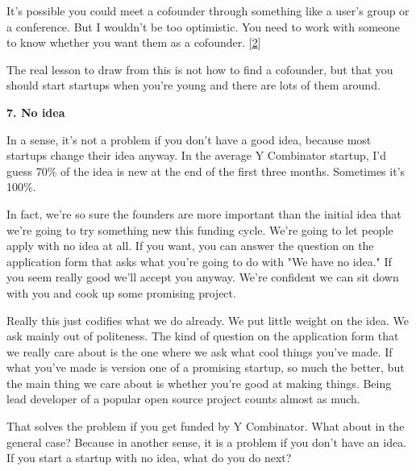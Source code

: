 It's possible you could meet a
                    cofounder through something like a user's group or a
                    conference. But I wouldn't be too optimistic. You need to
                    work with someone to know whether you want them as a
                    cofounder.
                    [\href{\#f2n}{2}]

The real lesson to draw from this is not how to
                    find a cofounder, but that you should start startups when
                    you're young and there are lots of them around.

\textbf{7. No idea}

In a sense, it's not a problem if you don't
                    have a good idea, because most startups change their idea
                    anyway. In the average Y Combinator startup, I'd guess 70\%
                    of the idea is new at the end of the first three months.
                    Sometimes it's 100\%.

In fact, we're so sure the
                    founders are more important than the initial idea that we're
                    going to try something new this funding cycle. We're going
                    to let people apply with no idea at all. If you want, you
                    can answer the question on the application form that asks
                    what you're going to do with "We have no idea." If you seem
                    really good we'll accept you anyway. We're confident we can
                    sit down with you and cook up some promising project.

Really
                    this just codifies what we do already. We put little weight
                    on the idea. We ask mainly out of politeness. The kind of
                    question on the application form that we really care about
                    is the one where we ask what cool things you've made. If
                    what you've made is version one of a promising startup, so
                    much the better, but the main thing we care about is whether
                    you're good at making things. Being lead developer of a
                    popular open source project counts almost as much.

That
                    solves the problem if you get funded by Y Combinator. What
                    about in the general case? Because in another sense, it is a
                    problem if you don't have an idea. If you start a startup
                    with no idea, what do you do next?

